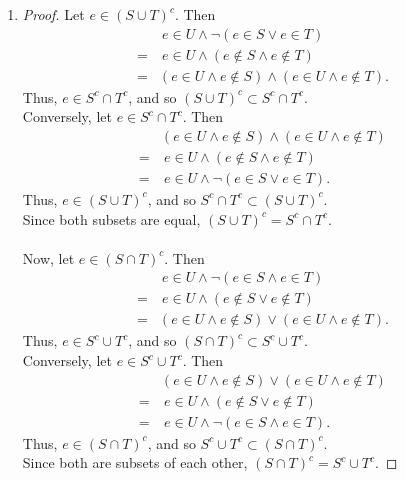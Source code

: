 \documentclass{homework}
\begin{document}
\begin{solution}
\begin{enumerate}[label=(\alph*)]
  \item 
    \begin{proof}[Proof]
        Let $e\in \left( S\cup T \right) ^{c}$. Then 
        \begin{align*}
          &~e\in U\land \neg \left( e \in S\lor e\in T\right) \\
          = &~e\in U\land \left( e\not\in S\land  e\not\in T \right) \\
          = &\left( e\in U\land e\not\in S\right) \land \left( e\in U\land e\not\in T \right) 
        .\end{align*}
        Thus, $e\in S^{c}\cap T^{c}$, and so $\left( S\cup T \right) ^{c}\subset S^{c}\cap T^{c}$.\\
        Conversely, let $e\in S^{c}\cap T^{c}$. Then
        \begin{align*}
          &\left( e\in U\land e\not\in S \right) \land \left(  e\in U\land e\not\in T \right)\\
          =&~e\in U\land \left( e\not\in S\land e\not\in T \right) \\
          =&~e\in U\land \neg \left(  e\in S\lor e\in T\right) 
        .\end{align*}
      Thus, $e\in \left( S\cup T \right) ^{c}$, and so $S^{c}\cap T^{c}\subset \left( S\cup T 
      \right) ^{c}$.\\
      Since both subsets are equal, $\left( S\cup T \right) ^{c}=S^{c}\cap T^{c}$. \\ \\
      Now, let $e\in \left( S\cap T \right) ^{c}$. Then 
      \begin{align*}
        &~e\in U\land \neg \left( e\in S\land e\in T \right) \\
        =&~e\in U\land \left( e\not\in S\lor e\not\in T \right) \\
        =&\left( e\in U\land e\not\in S \right) \lor \left( e\in U\land e\not\in T \right) 
      .\end{align*}
      Thus, $e\in S^{c}\cup T^{c}$, and so $\left( S\cap T\right) ^{c} \subset S^{c}\cup T^{c}$.\\
      Conversely, let $e\in S^{c}\cup T^{c}$. Then 
      \begin{align*}
        &\left( e\in U\land e\not\in S \right) \lor \left( e\in U\land e\not\in T \right)\\
        =&~e\in U \land \left( e\not\in S\lor e\not\in T \right) \\
        =&~e\in U\land \neg \left( e\in S\land e\in T \right)
      .\end{align*}
      Thus, $e\in \left( S\cap T \right) ^{c}$, and so $S^{c}\cup T^{c}\subset \left( S\cap 
      T \right) ^{c}$.\\
      Since both are subsets of each other, $\left( S\cap T \right) ^{c}=S^{c}\cup T^{c}$.
    \end{proof}



\end{enumerate}
\end{solution}
\end{document}
